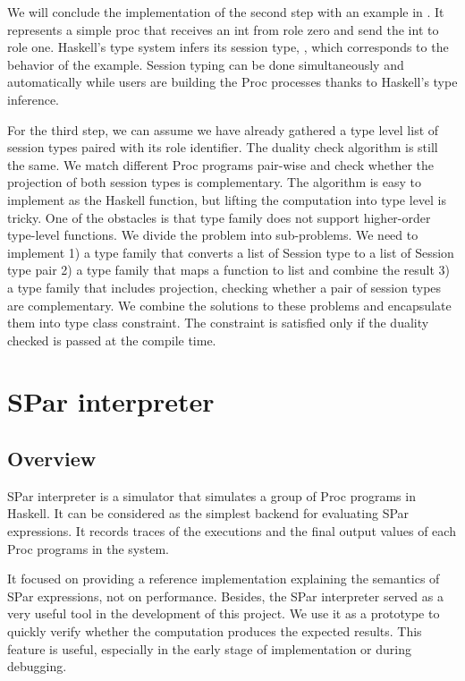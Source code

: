 We will conclude the implementation of the second step with an example in . It represents a simple proc that receives an int from role zero and send the int to role one. Haskell's type system infers its session type,  , which corresponds to the behavior of the example. Session typing can be done simultaneously and automatically while users are building the Proc processes thanks to Haskell's type inference.

For the third step, we can assume we have already gathered a type level list of session types paired with its role identifier. The duality check algorithm is still the same. We match different Proc programs pair-wise and check whether the projection of both session types is complementary. The algorithm is easy to implement as the Haskell function, but lifting the computation into type level is tricky. One of the obstacles is that type family does not support higher-order type-level functions. We divide the problem into sub-problems. We need to implement 1) a type family that converts a list of Session type to a list of Session type pair 2) a type family that maps a function to list and combine the result 3) a type family that includes projection, checking whether a pair of session types are complementary. We combine the solutions to these problems and encapsulate them into type class constraint. The constraint is satisfied only if the duality checked is passed at the compile time. 

\section{SPar interpreter} \label{impl:sec:interp}
\subsection{Overview}
SPar interpreter is a simulator that simulates a group of Proc programs in Haskell. It can be considered as the simplest backend for evaluating SPar expressions. It records traces of the executions and the final output values of each Proc programs in the system. 

It focused on providing a reference implementation explaining the semantics of SPar expressions, not on performance. Besides, the SPar interpreter served as a very useful tool in the development of this project. We use it as a prototype to quickly verify whether the computation produces the expected results. This feature is useful, especially in the early stage of implementation or during debugging.

